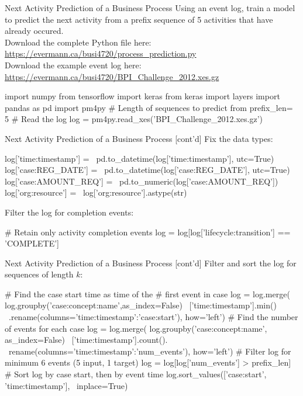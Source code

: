 \documentclass[ignorenonframetext,xcolor=x11names]{beamer}
\begin{document}
\begin{frame}[fragile]{Next Activity Prediction of a Business Process}
\small
Using an event log, train a model to predict the next activity from a prefix sequence of 5 activities that have already occured. \\

Download the complete Python file here: \url{https://evermann.ca/busi4720/process_prediction.py} \\

Download the example event log here: \url{https://evermann.ca/busi4720/BPI_Challenge_2012.xes.gz}

\begin{pythoncode}
import numpy
from tensorflow import keras
from keras import layers
import pandas as pd
import pm4py
# Length of sequences to predict from
prefix_len= 5
# Read the log
log = pm4py.read_xes('BPI_Challenge_2012.xes.gz')
\end{pythoncode}
\end{frame}

\begin{frame}[fragile]{Next Activity Prediction of a Business Process \small [cont'd]}
Fix the data types:
\begin{pythoncode}
log['time:timestamp'] = \
    pd.to_datetime(log['time:timestamp'], utc=True)
log['case:REG_DATE'] = \
    pd.to_datetime(log['case:REG_DATE'], utc=True)
log['case:AMOUNT_REQ'] = \
    pd.to_numeric(log['case:AMOUNT_REQ'])
log['org:resource'] = \
    log['org:resource'].astype(str)
\end{pythoncode}
Filter the log for completion events:
\begin{pythoncode}
# Retain only activity completion events
log = log[log['lifecycle:transition'] == 'COMPLETE']
\end{pythoncode}
\end{frame}

\begin{frame}[fragile]{Next Activity Prediction of a Business Process \small [cont'd]}
Filter and sort the log for sequences of length $k$:
\begin{pythoncode}
# Find the case start time as time of the 
# first event in case
log = log.merge( 
    log.groupby('case:concept:name',as_index=False) \
    ['time:timestamp'].min() \
    .rename(columns={'time:timestamp':'case:start'}), 
    how='left')
# Find the number of events for each case
log = log.merge( 
    log.groupby('case:concept:name', as_index=False) \
    ['time:timestamp'].count(). \
    rename(columns={'time:timestamp':'num_events'}), 
    how='left')
# Filter log for minimum 6 events (5 input, 1 target)
log = log[log['num_events'] > prefix_len]
# Sort log by case start, then by event time
log.sort_values(['case:start', 'time:timestamp'], \
    inplace=True)
\end{pythoncode}
\end{frame}
\end{document}
